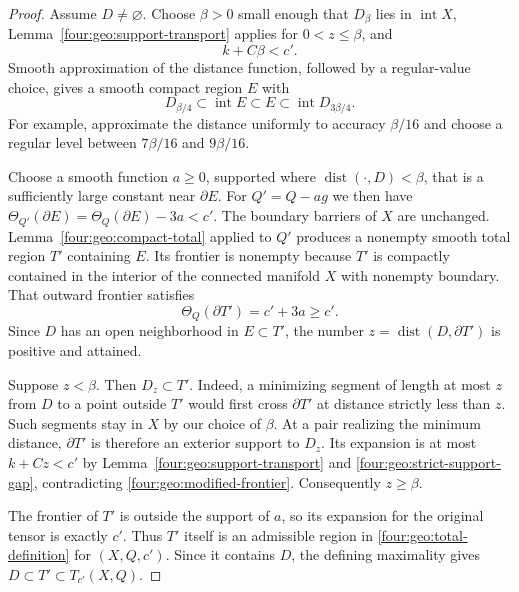 \begin{proof}
Assume $D\ne\varnothing$.  Choose $\beta>0$ small enough that $D_\beta$
lies in $\operatorname{int}X$, Lemma~\ref{four:geo:support-transport} applies
for $0<z\le\beta$, and
\begin{equation}\label{four:geo:strict-support-gap}
 k+C\beta<c'.
\end{equation}
Smooth approximation of the distance function, followed by a regular-value
choice, gives a smooth compact region $E$ with
\[
 D_{\beta/4}\subset\operatorname{int}E
 \subset E\subset\operatorname{int}D_{3\beta/4}.
\]
For example, approximate the distance uniformly to accuracy $\beta/16$
and choose a regular level between $7\beta/16$ and $9\beta/16$.

Choose a smooth function $a\ge0$, supported where
$\operatorname{dist}(\cdot,D)<\beta$, that is a sufficiently large
constant near $\partial E$.  For $Q'=Q-ag$ we then have
$\Theta_{Q'}(\partial E)=\Theta_Q(\partial E)-3a<c'$.
The boundary barriers of $X$ are unchanged.  Lemma~\ref{four:geo:compact-total}
applied to $Q'$ produces a nonempty smooth total region $T'$ containing
$E$.  Its frontier is nonempty because $T'$ is compactly contained in the
interior of the connected manifold $X$ with nonempty boundary.  That
outward frontier satisfies
\begin{equation}\label{four:geo:modified-frontier}
 \Theta_Q(\partial T')=c'+3a\ge c'.
\end{equation}
Since $D$ has an open neighborhood in $E\subset T'$, the number
$z=\operatorname{dist}(D,\partial T')$ is positive and attained.

Suppose $z<\beta$.  Then $D_z\subset T'$.  Indeed, a minimizing segment
of length at most $z$ from $D$ to a point outside $T'$ would first cross
$\partial T'$ at distance strictly less than $z$.  Such segments stay in
$X$ by our choice of $\beta$.  At a pair realizing the minimum distance,
$\partial T'$ is therefore an exterior support to $D_z$.  Its expansion
is at most $k+Cz<c'$ by Lemma~\ref{four:geo:support-transport} and
\eqref{four:geo:strict-support-gap}, contradicting
\eqref{four:geo:modified-frontier}.  Consequently $z\ge\beta$.

The frontier of $T'$ is outside the support of $a$, so its expansion for
the original tensor is exactly $c'$.  Thus $T'$ itself is an admissible
region in \eqref{four:geo:total-definition} for $(X,Q,c')$.  Since it contains
$D$, the defining maximality gives $D\subset T'\subset T_{c'}(X,Q)$.
\end{proof}

